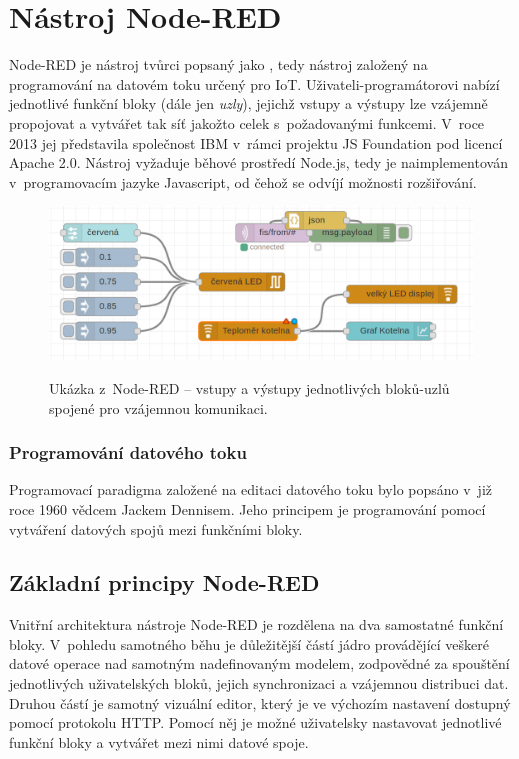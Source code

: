 \chapter{Nástroj Node-RED}
\label{ch:nastroj-node-red}

Node-RED je nástroj tvůrci popsaný jako , tedy nástroj založený na
programování na datovém toku určený pro IoT. Uživateli-programátorovi nabízí jednotlivé funkční bloky (dále jen \emph{uzly}),
jejichž vstupy a výstupy lze vzájemně propojovat a vytvářet tak síť jakožto celek s~požadovanými funkcemi. V~roce 2013 jej představila
společnost IBM v~rámci projektu JS Foundation pod licencí Apache 2.0. Nástroj vyžaduje běhové prostředí Node.js, tedy je
naimplementován v~programovacím jazyke Javascript, od čehož se odvíjí možnosti rozšiřování.

\begin{figure}
    \includegraphics[width=\textwidth]{figures/node-red-example.png}
    \label{fig-node-red-example}
    \caption{Ukázka z~Node-RED -- vstupy a výstupy jednotlivých bloků-uzlů spojené pro vzájemnou komunikaci.}
\end{figure}

\subsection{Programování datového toku}
Programovací paradigma založené na editaci datového toku bylo popsáno v~již roce 1960 vědcem Jackem Dennisem. Jeho
principem je programování pomocí vytváření datových spojů mezi funkčními bloky.

\section{Základní principy Node-RED}

Vnitřní architektura nástroje Node-RED je rozdělena na dva samostatné funkční bloky. V~pohledu samotného běhu je
důležitější částí jádro provádějící veškeré datové operace nad samotným nadefinovaným modelem, zodpovědné za spouštění
jednotlivých uživatelských bloků, jejich synchronizaci a vzájemnou distribuci dat. Druhou částí je samotný vizuální
editor, který je ve výchozím nastavení dostupný pomocí protokolu HTTP. Pomocí něj je možné uživatelsky nastavovat
jednotlivé funkční bloky a vytvářet mezi nimi datové spoje.

